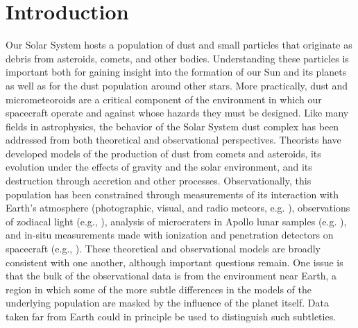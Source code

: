 \documentclass[preprint, trackchanges]{aastex61}
\begin{document}
\section{Introduction} \label{sec:intro}
Our Solar System hosts a population of dust and small particles that originate as debris from asteroids, comets, and other bodies.  Understanding these particles is important both for gaining insight into the formation of our Sun and its planets as well as for the dust population around other stars. More practically, dust and micrometeoroids are a critical component of the environment in which our spacecraft operate and against whose hazards they must be designed.  Like many fields in astrophysics, the behavior of the Solar System dust complex has been addressed from both theoretical and observational perspectives. Theorists have developed models of the production of dust from comets and asteroids,  its evolution under the effects of gravity and the solar environment, and its destruction through accretion and other processes. Observationally, this population has been constrained through measurements of its interaction with Earth's atmosphere (photographic, visual, and radio meteors, e.g. \cite{Halliday1984, Hawkes2007, Trigo-Rodriguez2008}), observations of zodiacal light (e.g.,  \cite{Krick2012, Durmont1980}), analysis of microcraters in Apollo lunar samples (e.g.  \cite{Allison1982}), and in-situ measurements made with ionization and penetration detectors on spacecraft (e.g.,  \cite{Weiden1978, Zhang1995}).  These theoretical and observational models are broadly consistent with one another, although important questions remain. One issue is that the bulk of the observational data is from the environment near Earth, a region in which some of the more subtle differences in the models of the underlying population are masked by the influence of the planet itself. Data taken far from Earth could in principle be used to distinguish such subtleties.
\\
\end{document}
